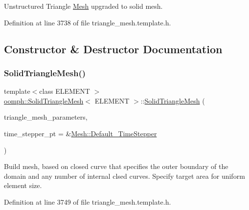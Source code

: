 Unstructured Triangle \hyperlink{classoomph_1_1Mesh}{Mesh} upgraded to solid mesh. 

Definition at line 3738 of file triangle\+\_\+mesh.\+template.\+h.



\subsection{Constructor \& Destructor Documentation}
\mbox{\label{classoomph_1_1SolidTriangleMesh_a0319b61fc3444922e2b55c9978f381f3}} 
\subsubsection{\texorpdfstring{Solid\+Triangle\+Mesh()}{SolidTriangleMesh()}\hspace{0.1cm}{\footnotesize\ttfamily [1/2]}}
{\footnotesize\ttfamily template$<$class E\+L\+E\+M\+E\+NT $>$ \\
\hyperlink{classoomph_1_1SolidTriangleMesh}{oomph\+::\+Solid\+Triangle\+Mesh}$<$ E\+L\+E\+M\+E\+NT $>$\+::\hyperlink{classoomph_1_1SolidTriangleMesh}{Solid\+Triangle\+Mesh} (\begin{DoxyParamCaption}\item[{\hyperlink{classoomph_1_1TriangleMeshParameters}{Triangle\+Mesh\+Parameters} \&}]{triangle\+\_\+mesh\+\_\+parameters,  }\item[{\hyperlink{classoomph_1_1TimeStepper}{Time\+Stepper} $\ast$}]{time\+\_\+stepper\+\_\+pt = {\ttfamily \&\hyperlink{classoomph_1_1Mesh_a12243d0fee2b1fcee729ee5a4777ea10}{Mesh\+::\+Default\+\_\+\+Time\+Stepper}} }\end{DoxyParamCaption})\hspace{0.3cm}{\ttfamily [inline]}}



Build mesh, based on closed curve that specifies the outer boundary of the domain and any number of internal clsed curves. Specify target area for uniform element size. 



Definition at line 3749 of file triangle\+\_\+mesh.\+template.\+h.

\mbox{\label{classoomph_1_1SolidTriangleMesh_a15a943bd43fece042e2ffdefc8ceb0f4}} 
